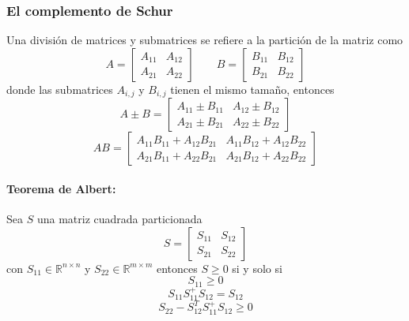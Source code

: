 \subsubsection{El complemento de Schur}

Una división de matrices y submatrices se refiere a la partición de la matriz
como
\[
  A=
  \begin{bmatrix}
    A_{11} & A_{12}\\
    A_{21} & A_{22}
  \end{bmatrix}
  \qquad
  B=
  \begin{bmatrix}
    B_{11} & B_{12}\\
    B_{21} & B_{22}
  \end{bmatrix}
\]
donde las submatrices $A_{i,j}$ y $B_{i,j}$ tienen el mismo tamaño, entonces
\[
  A\pm B=
  \begin{bmatrix}
    A_{11}\pm B_{11} & A_{12}\pm B_{12}\\
    A_{21}\pm B_{21} & A_{22}\pm B_{22}
  \end{bmatrix}
\]
\[
  AB=
  \begin{bmatrix}
    A_{11}B_{11}+A_{12}B_{21} &
    A_{11}B_{12}+A_{12}B_{22}\\
    A_{21}B_{11}+A_{22}B_{21} &
    A_{21}B_{12}+A_{22}B_{22}
  \end{bmatrix}
\]

\paragraph{Teorema de Albert:}
Sea $S$ una matriz cuadrada particionada
\[
  S=
  \begin{bmatrix}
    S_{11} & S_{12}\\
    S_{21} & S_{22}
  \end{bmatrix}
\]
con $S_{11}\in\mathbb{R}^{n\times n}$ y
$S_{22}\in\mathbb{R}^{m\times m}$ entonces $S\geq 0$ si y solo si
\[
  S_{11}\geq 0
\]
\[
  S_{11}S_{11}^{+}S_{12}=S_{12}
\]
\[
  S_{22}-S_{12}^{T}S_{11}^{+}S_{12}\geq 0
\]